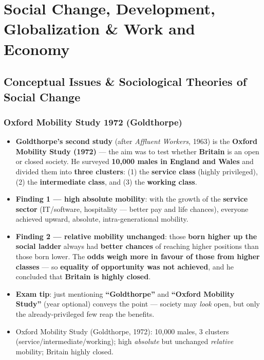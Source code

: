 \chapter{Social Change, Development, Globalization \& Work and Economy}

\section{Conceptual Issues \& Sociological Theories of Social Change}

\subsection{Oxford Mobility Study 1972 (Goldthorpe)}

\begin{DataFact}
\begin{itemize}
    \item \textbf{Goldthorpe's second study} (after \textit{Affluent Workers}, 1963) is the \textbf{Oxford Mobility Study (1972)} --- the aim was to test whether \textbf{Britain} is an open or closed society. He surveyed \textbf{10,000 males in England and Wales} and divided them into \textbf{three clusters}: (1) the \textbf{service class} (highly privileged), (2) the \textbf{intermediate class}, and (3) the \textbf{working class}.
    \item \textbf{Finding 1 --- high absolute mobility}: with the growth of the \textbf{service sector} (IT/software, hospitality --- better pay and life chances), everyone achieved upward, absolute, intra-generational mobility.
    \item \textbf{Finding 2 --- relative mobility unchanged}: those \textbf{born higher up the social ladder} always had \textbf{better chances} of reaching higher positions than those born lower. The \textbf{odds weigh more in favour of those from higher classes} --- so \textbf{equality of opportunity was not achieved}, and he concluded that \textbf{Britain is highly closed}.
    \item \textbf{Exam tip}: just mentioning \textbf{``Goldthorpe''} and \textbf{``Oxford Mobility Study''} (year optional) conveys the point --- society may \textit{look} open, but only the already-privileged few reap the benefits.
\end{itemize}
\end{DataFact}

\begin{QuickRevision}
\begin{itemize}
    \item Oxford Mobility Study (Goldthorpe, 1972): 10,000 males, 3 clusters (service/intermediate/working); high \textit{absolute} but unchanged \textit{relative} mobility; Britain highly closed.
\end{itemize}
\end{QuickRevision}

